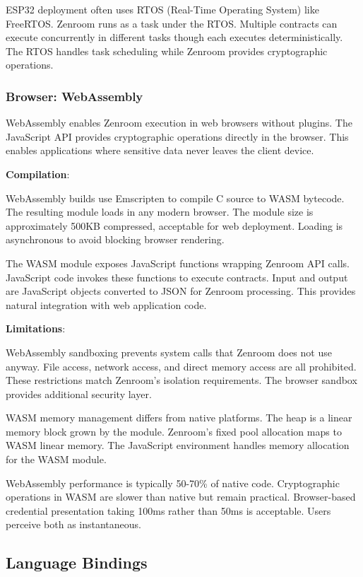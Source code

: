 ESP32 deployment often uses RTOS (Real-Time Operating System) like
FreeRTOS. Zenroom runs as a task under the RTOS. Multiple contracts
can execute concurrently in different tasks though each executes
deterministically. The RTOS handles task scheduling while Zenroom
provides cryptographic operations.

\subsubsection{Browser: WebAssembly}

WebAssembly enables Zenroom execution in web browsers without
plugins. The JavaScript API provides cryptographic operations directly
in the browser. This enables applications where sensitive data never
leaves the client device.

\textbf{Compilation}:

WebAssembly builds use Emscripten to compile C source to WASM
bytecode. The resulting module loads in any modern browser. The module
size is approximately 500KB compressed, acceptable for web
deployment. Loading is asynchronous to avoid blocking browser
rendering.

The WASM module exposes JavaScript functions wrapping Zenroom API
calls. JavaScript code invokes these functions to execute
contracts. Input and output are JavaScript objects converted to JSON
for Zenroom processing. This provides natural integration with web
application code.

\textbf{Limitations}:

WebAssembly sandboxing prevents system calls that Zenroom does not use
anyway. File access, network access, and direct memory access are all
prohibited. These restrictions match Zenroom's isolation
requirements. The browser sandbox provides additional security layer.

WASM memory management differs from native platforms. The heap is a
linear memory block grown by the module. Zenroom's fixed pool
allocation maps to WASM linear memory. The JavaScript environment
handles memory allocation for the WASM module.

WebAssembly performance is typically 50-70\% of native
code. Cryptographic operations in WASM are slower than native but
remain practical. Browser-based credential presentation taking 100ms
rather than 50ms is acceptable. Users perceive both as instantaneous.

\subsection{Language Bindings}

